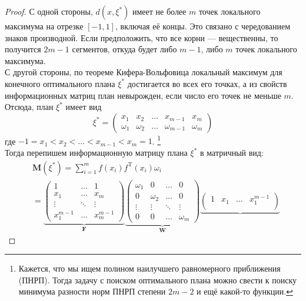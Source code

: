 \documentclass[12pt, a4paper]{article}
\begin{document}
\begin{proof}
		С одной стороны, $d(x, \xi^*)$ имеет не более $m$ точек локального максимума на отрезке $[-1,1]$, включая её концы. Это связано с чередованием знаков производной. Если предположить, что все корни --- вещественны, то получится $2m-1$ сегментов, откуда будет либо $m-1$, либо $m$ точек локального максимума.\\
		С другой стороны, по теореме Кифера-Вольфовица локальный максимум для конечного оптимального плана $\xi^*$ достигается во всех его точках, а из свойств информационных матриц план невырожден, если число его точек не меньше $m$. Отсюда, план $\xi^*$ имеет вид
		\begin{equation*}
			\xi^*=
			\begin{pmatrix}
				x_1&x_2&\dots&x_{m-1}&x_m\\
				\omega_1&\omega_2&\dots&\omega_{m-1}&\omega_m
			\end{pmatrix}
		\end{equation*}  
		где $-1=x_1<x_2<\dots<x_{m-1}<x_m=1$.  \footnote{Кажется, что мы ищем полином наилучшего равномерного приближения (ПНРП). Тогда задачу с поиском оптимального плана можно свести к поиску минимума разности норм ПНРП степени $2m-2$ и ещё какой-то функции.}\\
		Тогда перепишем информационную матрицу плана $\xi^*$ в матричный вид:
		\begin{align*}
			&\mathbf{M}(\xi^*)=\sum_{i=1}^mf(x_i)f^\mathrm{T}(x_i)\omega_i\\
			&=
			\underbrace{\begin{pmatrix}
			1&\dots&1\\
			x_1&\dots&x_m\\
			\vdots&\ddots&\vdots\\
			x_1^{m-1}&\dots&x_m^{m-1}	
			\end{pmatrix}}_\mathbf{F}
			\underbrace{\begin{pmatrix}
				\omega_1&0&\dots&0\\
				0&\omega_2&\dots&0\\
				\vdots&\vdots&\ddots&\vdots\\
				0&0&\dots&\omega_m
			\end{pmatrix}}_\mathbf{W}
			\underbrace{\begin{pmatrix}
				1&x_1&\dots&x_1^{m-1}\\

\end{pmatrix}}
\end{align*}
\end{proof}
\end{document}
